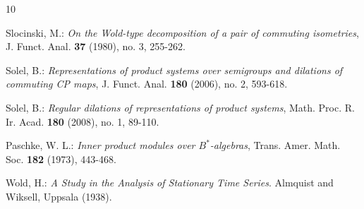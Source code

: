 \documentclass[12pt]{amsart}
\numberwithin{equation}{section}
\theoremstyle{plain}
\begin{document}
\begin{thebibliography}{10}
		
		Slocinski, M.: \emph{On the Wold-type decomposition of a pair of commuting isometries},
		J. Funct. Anal. \textbf{37} (1980), no. 3, 255-262.
	
		
		Solel, B.: \emph{ Representations of product systems over semigroups and dilations of commuting CP maps},
		J. Funct. Anal. \textbf{180} (2006), no. 2, 593-618.
	
		
		Solel, B.: \emph{Regular dilations of representations of product systems},
		Math. Proc. R. Ir. Acad. \textbf{180} (2008), no. 1, 89-110.
		
		
		 Paschke, W. L.: \emph{Inner product modules over {$B^{\ast} $}-algebras},
		Trans. Amer. Math. Soc. \textbf{182} (1973), 443-468.
		
		 Wold, H.: \emph{A Study in the Analysis of Stationary Time Series}. Almquist and Wiksell, Uppsala (1938).

		
		
		
		
	\end{thebibliography}
	
	
	
\end{document}
